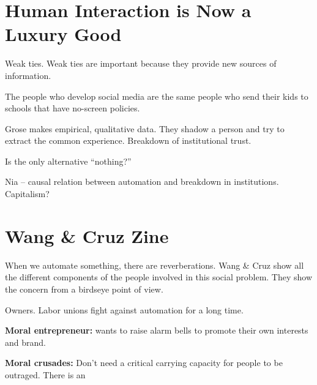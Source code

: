 \section{Human Interaction is Now a Luxury Good}
Weak ties.
Weak ties are important because they provide new sources of information.

The people who develop social media are the same people who send their kids to schools that have no-screen policies.

Grose makes empirical, qualitative data.
They shadow a person and try to extract the common experience.
Breakdown of institutional trust.

Is the only alternative ``nothing?''

Nia -- causal relation between automation and breakdown in institutions.
Capitalism?

\section{Wang \& Cruz Zine}
When we automate something, there are reverberations.
Wang \& Cruz show all the different components of the people involved in this social problem.
They show the concern from a birdseye point of view.

Owners.
Labor unions fight against automation for a long time.

\textbf{Moral entrepreneur:} wants to raise alarm bells to promote their own interests and brand.

\textbf{Moral crusades:} Don't need a critical carrying capacity for people to be outraged.
There is an 